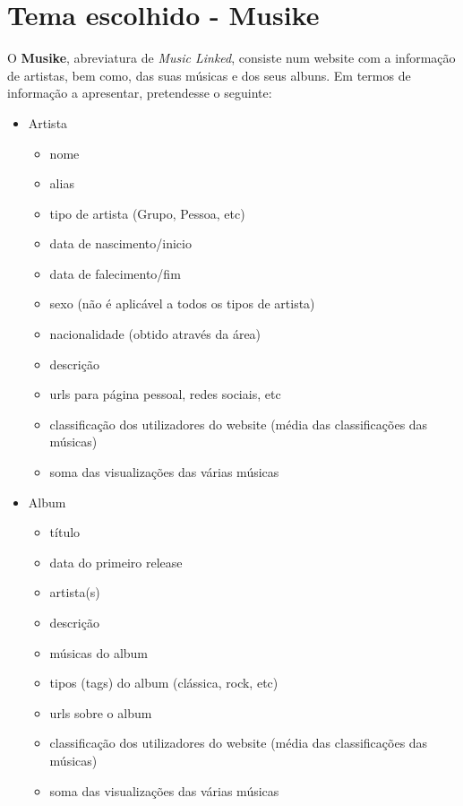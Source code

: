 \documentclass{article}
\begin{document}
\section{Tema escolhido - \textbf{Musike}} \label{tema}

O \textbf{Musike}, abreviatura de \textit{Music Linked}, consiste num website com a informação de artistas, bem como, das suas músicas e dos seus albuns. Em termos de informação a apresentar, pretendesse o seguinte:
\begin{itemize}
    \item Artista
        \begin{itemize}
            \item nome
            \item alias
            \item tipo de artista (Grupo, Pessoa, etc)
            \item data de nascimento/inicio
            \item data de falecimento/fim
            \item sexo (não é aplicável a todos os tipos de artista)
            \item nacionalidade (obtido através da área)
            \item descrição
            \item urls para página pessoal, redes sociais, etc
            \item classificação dos utilizadores do website (média das classificações das músicas)
            \item soma das visualizações das várias músicas
        \end{itemize}
    \item Album
        \begin{itemize}
            \item título
            \item data do primeiro release
            \item artista(s)
            \item descrição
            \item músicas do album
            \item tipos (tags) do album (clássica, rock, etc)
            \item urls sobre o album
            \item classificação dos utilizadores do website (média das classificações das músicas)
            \item soma das visualizações das várias músicas

\end{itemize}
\end{itemize}
\end{document}

